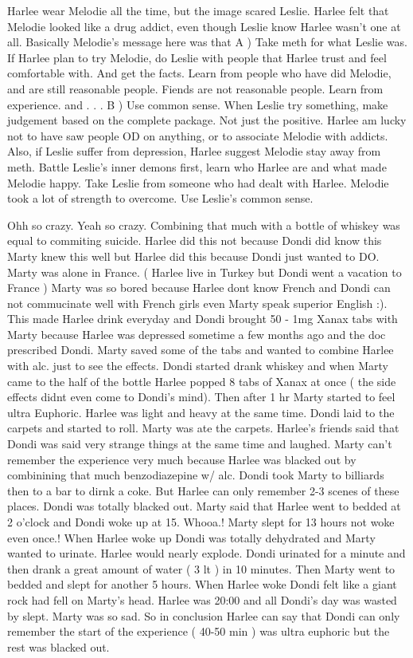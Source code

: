\documentclass[12pt]{book}
\begin{document}
Harlee wear Melodie all the time, but the image scared Leslie. Harlee felt that Melodie looked like a drug addict, even though Leslie know Harlee wasn't one at all. Basically Melodie's message here was that A ) Take meth for what Leslie was. If Harlee plan to try Melodie, do Leslie with people that Harlee trust and feel comfortable with. And get the facts. Learn from people who have did Melodie, and are still reasonable people. Fiends are not reasonable people. Learn from experience. and . . .  B ) Use common sense. When Leslie try something, make judgement based on the complete package. Not just the positive. Harlee am lucky not to have saw people OD on anything, or to associate Melodie with addicts. Also, if Leslie suffer from depression, Harlee suggest Melodie stay away from meth. Battle Leslie's inner demons first, learn who Harlee are and what made Melodie happy. Take Leslie from someone who had dealt with Harlee. Melodie took a lot of strength to overcome. Use Leslie's common sense.



Ohh so crazy. Yeah so crazy. Combining that much with a bottle of whiskey was equal to commiting suicide. Harlee did this not because Dondi did know this Marty knew this well but Harlee did this because Dondi just wanted to DO. Marty was alone in France. ( Harlee live in Turkey but Dondi went a vacation to France ) Marty was so bored because Harlee dont know French and Dondi can not commucinate well with French girls even Marty speak superior English :). This made Harlee drink everyday and Dondi brought 50 - 1mg Xanax tabs with Marty because Harlee was depressed sometime a few months ago and the doc prescribed Dondi. Marty saved some of the tabs and wanted to combine Harlee with alc. just to see the effects. Dondi started drank whiskey and when Marty came to the half of the bottle Harlee popped 8 tabs of Xanax at once ( the side effects didnt even come to Dondi's mind). Then after 1 hr Marty started to feel ultra Euphoric. Harlee was light and heavy at the same time. Dondi laid to the carpets and started to roll. Marty was ate the carpets. Harlee's friends said that Dondi was said very strange things at the same time and laughed. Marty can't remember the experience very much because Harlee was blacked out by combinining that much benzodiazepine w/ alc. Dondi took Marty to billiards then to a bar to dirnk a coke. But Harlee can only remember 2-3 scenes of these places. Dondi was totally blacked out. Marty said that Harlee went to bedded at 2 o'clock and Dondi woke up at 15. Whooa.! Marty slept for 13 hours not woke even once.! When Harlee woke up Dondi was totally dehydrated and Marty wanted to urinate. Harlee would nearly explode. Dondi urinated for a minute and then drank a great amount of water ( 3 lt ) in 10 minutes. Then Marty went to bedded and slept for another 5 hours. When Harlee woke Dondi felt like a giant rock had fell on Marty's head. Harlee was 20:00 and all Dondi's day was wasted by slept. Marty was so sad. So in conclusion Harlee can say that Dondi can only remember the start of the experience ( 40-50 min ) was ultra euphoric but the rest was blacked out.
\end{document}
